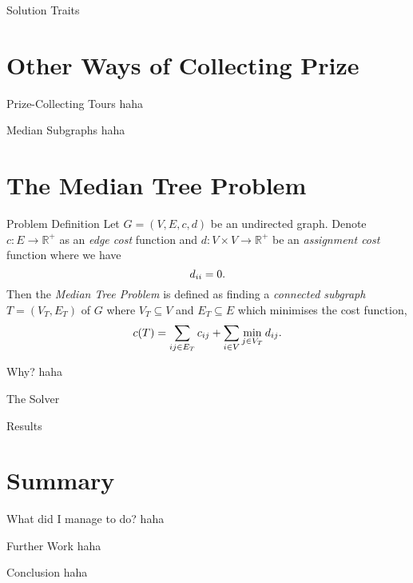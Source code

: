 \documentclass[rgb,dvipsnames]{beamer}
\newcommand{\RR}{\mathbb{R}}      %
\begin{document}
\begin{frame}{Solution Traits}
  
\end{frame}

\section{Other Ways of Collecting Prize}
\begin{frame}{Prize-Collecting Tours}
  haha
\end{frame}

\begin{frame}{Median Subgraphs}
  haha
\end{frame}

\section{The Median Tree Problem}
\begin{frame}{Problem Definition}
  Let $G = (V, E, c, d)$ be an undirected graph. Denote $c : E \to \RR^+$ as an \textit{edge cost} function
and $d : V \times V  \to \RR^+$ be an \textit{assignment cost} function where we have
\[d_{ii} = 0 \mathnormal{.}\]
Then the \textit{Median Tree Problem}
is defined as finding a \textit{connected subgraph} $T = (V_T, E_T)$ of $G$
where $V_T \subseteq V$ and
$E_T \subseteq E$ which minimises the cost function,
\[c(T) = \sum_{ij \in E_T} c_{ij} + \sum_{i \in V} \min_{j \in V_T} d_{ij}\mathnormal{.}\]

\end{frame}

\begin{frame}{Why?}
  haha
\end{frame}

\begin{frame}{The Solver}
  
\end{frame}
\begin{frame}{Results}
  
\end{frame}
\section{Summary}
\begin{frame}{What did I manage to do?}
  haha
\end{frame}
\begin{frame}{Further Work}
  haha
\end{frame}
\begin{frame}{Conclusion}
  haha
\end{frame}
\end{document}
